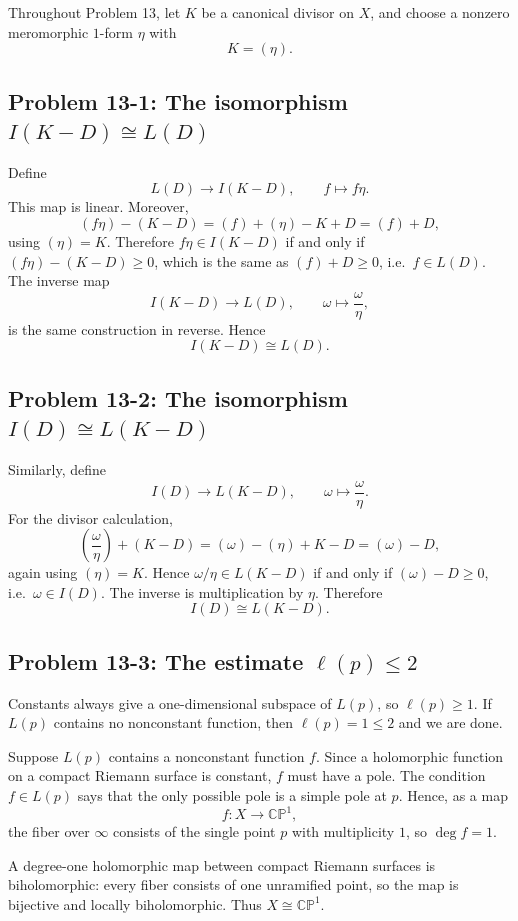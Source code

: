 \documentclass[11pt]{article}
\newcommand{\CP}{\mathbb{CP}}
\begin{document}
Throughout Problem 13, let $K$ be a canonical divisor on $X$, and choose a nonzero meromorphic $1$-form $\eta$ with
\[
 K=(\eta).
\]

\subsection*{Problem 13-1: The isomorphism $I(K-D)\cong L(D)$}

Define
\[
 L(D)\longrightarrow I(K-D),\qquad f\longmapsto f\eta.
\]
This map is linear. Moreover,
\[
 (f\eta)-(K-D)
 =
 (f)+(\eta)-K+D
 =
 (f)+D,
\]
using $(\eta)=K$. Therefore $f\eta\in I(K-D)$ if and only if $(f\eta)-(K-D)\geq 0$, which is the same as $(f)+D\geq 0$, i.e.\ $f\in L(D)$. The inverse map
\[
 I(K-D)\longrightarrow L(D),\qquad \omega\longmapsto \frac{\omega}{\eta},
\]
is the same construction in reverse. Hence
\[
 I(K-D)\cong L(D).
\]

\subsection*{Problem 13-2: The isomorphism $I(D)\cong L(K-D)$}

Similarly, define
\[
 I(D)\longrightarrow L(K-D),\qquad \omega\longmapsto \frac{\omega}{\eta}.
\]
For the divisor calculation,
\[
 \left(\frac{\omega}{\eta}\right)+(K-D)
 =
 (\omega)-(\eta)+K-D
 =
 (\omega)-D,
\]
again using $(\eta)=K$. Hence $\omega/\eta\in L(K-D)$ if and only if $(\omega)-D\geq 0$, i.e.\ $\omega\in I(D)$. The inverse is multiplication by $\eta$. Therefore
\[
 I(D)\cong L(K-D).
\]

\subsection*{Problem 13-3: The estimate $\ell(p)\leq 2$}

Constants always give a one-dimensional subspace of $L(p)$, so $\ell(p)\geq 1$. If $L(p)$ contains no nonconstant function, then $\ell(p)=1\leq 2$ and we are done.

Suppose $L(p)$ contains a nonconstant function $f$. Since a holomorphic function on a compact Riemann surface is constant, $f$ must have a pole. The condition $f\in L(p)$ says that the only possible pole is a simple pole at $p$. Hence, as a map
\[
 f:X\to\CP^1,
\]
the fiber over $\infty$ consists of the single point $p$ with multiplicity $1$, so $\deg f=1$.

A degree-one holomorphic map between compact Riemann surfaces is biholomorphic: every fiber consists of one unramified point, so the map is bijective and locally biholomorphic. Thus $X\cong\CP^1$.
\end{document}

